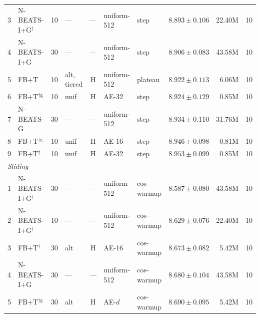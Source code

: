 \begin{table}[h]
{\begin{tabular}{@{}clllcllrrr@{}}
    3 & N-BEATS-I+G$^{\dag}$       & 10 & ---         & --- & uniform-512 & step    & $8.893 \pm 0.106$          & 22.40M & 10 \\
    4 & N-BEATS-I+G                & 30 & ---         & --- & uniform-512 & step    & $8.906 \pm 0.083$          & 43.58M & 10 \\
    5 & FB+T                       & 10 & alt, tiered & H   & uniform-512 & plateau & $8.922 \pm 0.113$          & 6.06M  & 10 \\
    6 & FB+T$^{\dag\mathrm{g}}$    & 10 & unif        & H   & AE-32       & step    & $8.924 \pm 0.129$          & 0.85M  & 10 \\
    7 & N-BEATS-G                  & 30 & ---         & --- & uniform-512 & step    & $8.934 \pm 0.110$          & 31.76M & 10 \\
    8 & FB+T$^{\dag\mathrm{g}}$    & 10 & unif        & H   & AE-16       & step    & $8.946 \pm 0.098$          & 0.81M  & 10 \\
    9 & FB+T$^{\dag}$              & 10 & unif        & H   & AE-32       & step    & $8.953 \pm 0.099$          & 0.85M  & 10 \\
    \midrule
    \multicolumn{10}{l}{\textit{Sliding}} \\
    \midrule
    1 & N-BEATS-I+G$^{\dag}$       & 30 & ---  & --- & uniform-512 & cos-warmup & $\mathbf{8.587 \pm 0.080}$ & 43.58M & 10 \\
    2 & N-BEATS-I+G$^{\dag}$       & 10 & ---  & --- & uniform-512 & cos-warmup & $8.629 \pm 0.076$          & 22.40M & 10 \\
    3 & FB+T$^{\dag}$              & 30 & alt  & H   & AE-16       & cos-warmup & $8.673 \pm 0.082$          & 5.42M  & 10 \\
    4 & N-BEATS-I+G                & 30 & ---  & --- & uniform-512 & cos-warmup & $8.680 \pm 0.104$          & 43.58M & 10 \\
    5 & FB+T$^{\dag\mathrm{g}}$    & 30 & alt  & H   & AE-$d$      & cos-warmup & $8.690 \pm 0.095$          & 5.42M  & 10 \\
    \bottomrule
  \end{tabular}}
\end{table}
